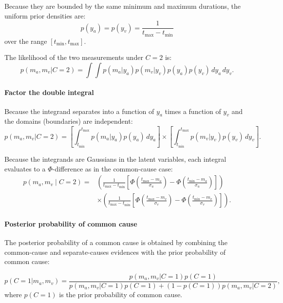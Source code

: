 \documentclass{biorxiv}
\begin{document}
Because they are bounded by the same minimum and maximum durations, the uniform prior densities are:
\begin{equation}
p(y_a) = p(y_v) = \frac{1}{t_{\max} - t_{\min}}
\end{equation}
over the range $[t_{\min}, t_{\max}]$.

The likelihood of the two measurements under $C=2$ is:
\begin{equation}
p(m_a, m_v | C=2) = \int \int p(m_a | y_a) p(m_v | y_v) p(y_a) p(y_v) \, dy_a \, dy_v.
\end{equation}


\paragraph{Factor the double integral}

Because the integrand separates into a function of $y_a$ times a function of $y_v$ and the domains (boundaries) are independent:
\begin{equation}
p(m_a, m_v | C=2) = \left[\int_{t_{\min}}^{t_{\max}} p(m_a | y_a) p(y_a) \, dy_a\right] 
\times \left[\int_{t_{\min}}^{t_{\max}} p(m_v | y_v) p(y_v) \, dy_v\right].
\end{equation}

Because the integrands are Gaussians in the latent variables, each integral evaluates to a $\Phi$-difference as in the common-cause case:
\begin{align}
\label{eq:likelihood_c2_final}
p(m_a, m_v \mid C\!=\!2)
= &\left(\frac{1}{t_{\max} - t_{\min}} \left[\Phi\!\left(\frac{t_{\max} - m_a}{\sigma_a}\right) - \Phi\!\left(\frac{t_{\min} - m_a}{\sigma_a}\right)\right]\right) \\
 &\times \left(\frac{1}{t_{\max} - t_{\min}} \left[\Phi\!\left(\frac{t_{\max} - m_v}{\sigma_v}\right) - \Phi\!\left(\frac{t_{\min} - m_v}{\sigma_v}\right)\right]\right).
\end{align}

\paragraph{Posterior probability of common cause}

The posterior probability of a common cause is obtained by combining the common-cause and separate-causes evidences with the prior probability of common cause:

\begin{equation}
p(C=1 | m_a, m_v) = \frac{p(m_a, m_v | C=1) p(C=1)}{p(m_a, m_v | C=1) p(C=1) + (1 - p(C=1)) p(m_a, m_v | C=2)},
\end{equation}
where $p(C = 1)$ is the prior probability of common cause.
\end{document}
